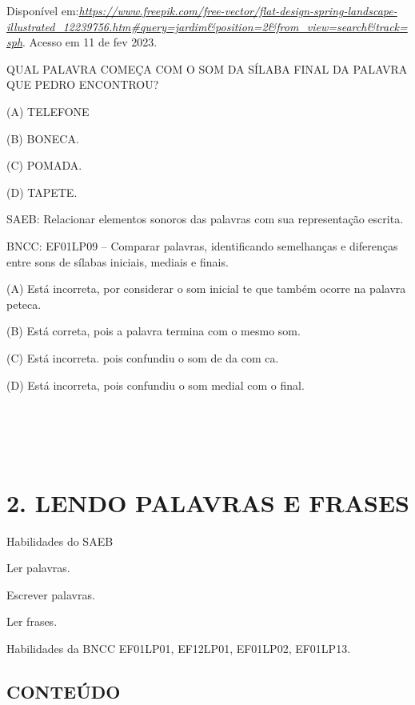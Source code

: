 Disponível
em:\href{https://www.freepik.com/free-vector/flat-design-spring-landscape-illustrated_12239756.htm\#query=jardim\&position=2\&from_view=search\&track=sph}{\emph{https://www.freepik.com/free-vector/flat-design-spring-landscape-illustrated\_12239756.htm\#query=jardim\&position=2\&from\_view=search\&track=sph}}.
Acesso em 11 de fev 2023.

QUAL PALAVRA COMEÇA COM O SOM DA SÍLABA FINAL DA PALAVRA QUE PEDRO
ENCONTROU?

(A) TELEFONE

(B) BONECA.

(C) POMADA.

(D) TAPETE.

\protect\hypertarget{_heading=h.2et92p0}{}{}SAEB: Relacionar elementos
sonoros das palavras com sua representação escrita.

BNCC: EF01LP09 -- Comparar palavras, identificando semelhanças e diferenças
entre sons de sílabas iniciais, mediais e finais.

\protect\hypertarget{_heading=h.tyjcwt}{}{}(A) Está incorreta, por
considerar o som inicial te que também ocorre na palavra peteca.

(B) Está correta, pois a palavra termina com o mesmo som.

(C) Está incorreta. pois confundiu o som de da com ca.

(D) Está incorreta, pois confundiu o som medial com o final.

\section{\texorpdfstring{\\
}{ }}\label{section-3}

\section{2. LENDO PALAVRAS E FRASES
}\label{muxf3dulo-2-lendo-palavras-e-frases}

Habilidades do SAEB

\protect\hypertarget{_heading=h.3dy6vkm}{}{}Ler palavras.

Escrever palavras.

Ler frases.

Habilidades da BNCC 
EF01LP01, EF12LP01, EF01LP02, EF01LP13.

\subsection{CONTEÚDO}\label{conteuxfado-1}

